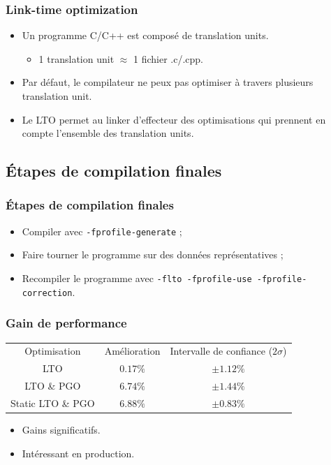 \documentclass{beamer}
\begin{document}
\begin{frame}
    \frametitle{Link-time optimization}

    \begin{itemize}
        \item Un programme C/C++ est composé de translation units.
              \begin{itemize}
                  \item 1 translation unit $ \approx $ 1 fichier .c/.cpp.
              \end{itemize}
        \item Par défaut, le compilateur ne peux pas optimiser à travers plusieurs translation unit.
        \item Le LTO permet au linker d'effecteur des optimisations qui prennent en compte l'ensemble des translation units.
    \end{itemize}
\end{frame}

\subsection{Étapes de compilation finales}

\begin{frame}[fragile]
    \frametitle{Étapes de compilation finales}

    \begin{itemize}
        \item Compiler avec \verb'-fprofile-generate' ;
        \item Faire tourner le programme sur des données représentatives ;
        \item Recompiler le programme avec \verb'-flto -fprofile-use -fprofile-correction'.
    \end{itemize}
\end{frame}

\begin{frame}[fragile]
    \frametitle{Gain de performance}

    \begin{center}
        \begin{tabular}{ c c c }
            Optimisation      & Amélioration & Intervalle de confiance ($2\sigma$) \\
            LTO               & $0.17\%$     & $\pm 1.12\%$                        \\
            LTO \& PGO        & $6.74\%$     & $\pm 1.44\%$                        \\
            Static LTO \& PGO & $6.88\%$     & $\pm 0.83\%$
        \end{tabular}
    \end{center}

    \begin{itemize}
        \item Gains significatifs.
        \item Intéressant en production.
    \end{itemize}
\end{frame}
\end{document}
